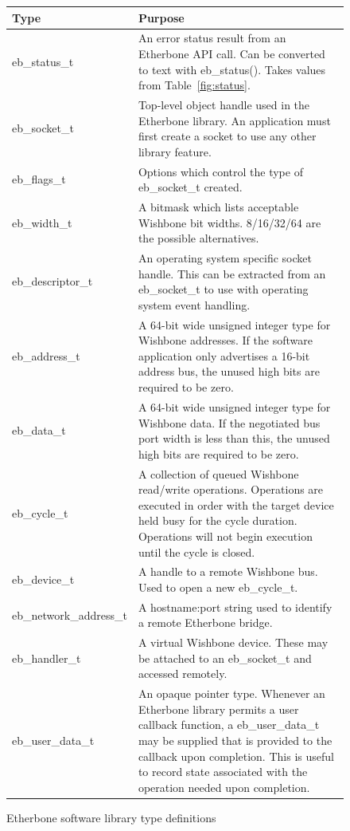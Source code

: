 \documentclass{article}
\begin{document}
\begin{figure}[t!]
\centering
\begin{tabular}{|l|p{}|}
\hline
Type & Purpose \\
\hline
eb\_status\_t &
An error status result from an Etherbone API call.
Can be converted to text with eb\_status().
Takes values from Table~\ref{fig:status}.
\\
eb\_socket\_t & 
Top-level object handle used in the Etherbone library. 
An application must first create a socket to use any other library feature.
\\
eb\_flags\_t &
Options which control the type of eb\_socket\_t created.
\\
eb\_width\_t &
A bitmask which lists acceptable Wishbone bit widths.
8/16/32/64 are the possible alternatives.
\\
eb\_descriptor\_t &
An operating system specific socket handle.
This can be extracted from an eb\_socket\_t to use with operating system event handling.
\\
eb\_address\_t & 
A 64-bit wide unsigned integer type for Wishbone addresses.
If the software application only advertises a 16-bit address bus,
the unused high bits are required to be zero.
\\
eb\_data\_t & 
A 64-bit wide unsigned integer type for Wishbone data.
If the negotiated bus port width is less than this,
the unused high bits are required to be zero.
\\
eb\_cycle\_t & 
A collection of queued Wishbone read/write operations.
Operations are executed in order with the target device held busy for the
cycle duration.
Operations will not begin execution until the cycle is closed.
\\
eb\_device\_t &
A handle to a remote Wishbone bus.
Used to open a new eb\_cycle\_t.
\\
eb\_network\_address\_t &
A hostname:port string used to identify a remote Etherbone bridge.
\\
eb\_handler\_t &
A virtual Wishbone device.
These may be attached to an eb\_socket\_t and accessed remotely.
\\
eb\_user\_data\_t &
An opaque pointer type.
Whenever an Etherbone library permits a user callback function,
a eb\_user\_data\_t may be supplied that is provided to the callback upon
completion.
This is useful to record state associated with the operation needed upon
completion.
\\
\hline
\end{tabular}
\caption{Etherbone software library type definitions}
\label{fig:types}
\end{figure}
\end{document}
